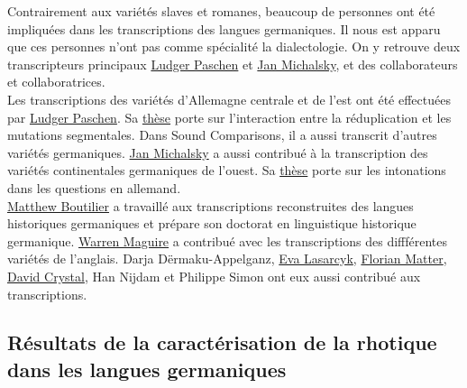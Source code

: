 Contrairement aux variétés slaves et romanes, beaucoup de personnes ont été impliquées dans les transcriptions des langues germaniques. Il nous est apparu que ces personnes n'ont pas comme spécialité la dialectologie. On y retrouve deux transcripteurs principaux \href{http://www.ludgerpaschen.de/}{Ludger Paschen} et \href{https://www.researchgate.net/profile/Jan-Michalsky}{Jan Michalsky}, et des collaborateurs et collaboratrices.\\
Les transcriptions des variétés d'Allemagne centrale et de l'est ont été effectuées par \href{http://www.ludgerpaschen.de/}{Ludger Paschen}. Sa \href{https://www.ludgerpaschen.de/papers/Paschen2018_PhD.pdf}{thèse} \parencite{paschenInteractionReduplicationSegmental2018} porte sur l'interaction entre la réduplication et les mutations segmentales. Dans Sound Comparisons, il a aussi transcrit d'autres variétés germaniques.
\href{https://www.researchgate.net/profile/Jan-Michalsky}{Jan Michalsky} a aussi contribué à la transcription des variétés continentales germaniques de l'ouest. Sa \href{https://www.degruyter.com/document/doi/10.1515/9783110538564/html}{thèse} \parencite{michalskyFrageintonationImDeutschen2017} porte sur les intonations dans les questions en allemand.\\

\href{https://gns.wisc.edu/person/matthew-boutilier/}{Matthew Boutilier} a travaillé aux transcriptions reconstruites des langues historiques germaniques et prépare son doctorat en linguistique historique germanique.
\href{http://www.lel.ed.ac.uk/~wmaguire/}{Warren Maguire} a contribué avec les transcriptions des diffférentes variétés de l'anglais.
Darja Dërmaku-Appelganz, \href{https://www.coli.uni-saarland.de/~evaly/}{Eva Lasarcyk}, \href{https://florianmatter.gitlab.io/}{Florian Matter}, \href{https://www.davidcrystal.com/GBR/David-Crystal}{David Crystal}, Han Nijdam et Philippe Simon ont eux aussi contribué aux transcriptions.\\

\subsection{Résultats de la caractérisation de la rhotique dans les langues germaniques}

